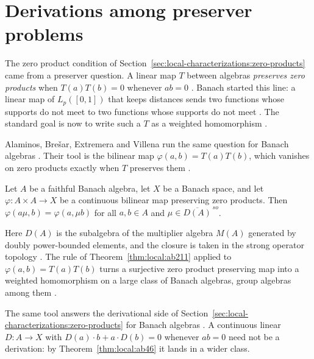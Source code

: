 \section{Derivations among preserver problems}\label{sec:local-characterizations:preservers}

The zero product condition of Section~\ref{sec:local-characterizations:zero-products}
came from a preserver question. A linear map $T$ between algebras
\emph{preserves zero products} when $T(a)T(b)=0$ whenever $ab=0$
\cite[p.~131]{AlaminosBresar2009}. Banach started this line: a linear map of
$L_p([0,1])$ that keeps distances sends two functions whose supports do not
meet to two functions whose supports do not meet
\cite[p.~131]{AlaminosBresar2009}. The standard goal
is now to write such a $T$ as a weighted homomorphism
\cite[p.~132]{AlaminosBresar2009}.

Alaminos, Bre\v{s}ar, Extremera and Villena run the same question for
Banach algebras \cite[p.~131]{AlaminosBresar2009}. Their tool is the
bilinear map $\varphi(a,b)=T(a)T(b)$, which vanishes on zero products
exactly when $T$ preserves them \cite[p.~132]{AlaminosBresar2009}.

\begin{theorem}\label{thm:local:ab211}
Let $A$ be a faithful Banach algebra, let $X$ be a Banach space, and let
$\varphi\colon A\times A\to X$ be a continuous bilinear map preserving zero
products. Then $\varphi(a\mu,b)=\varphi(a,\mu b)$ for all $a,b\in A$ and
$\mu\in\overline{D(A)}^{\,so}$.
\end{theorem}

Here $D(A)$ is the subalgebra of the multiplier algebra $M(A)$ generated by
doubly power-bounded elements, and the closure is taken in the strong
operator topology \cite[p.~143]{AlaminosBresar2009}. The rule of
Theorem~\ref{thm:local:ab211} applied to $\varphi(a,b)=T(a)T(b)$ turns a
surjective zero product preserving map into a weighted homomorphism on a
large class of Banach algebras, group algebras among them
\cite[Theorem~3.6, p.~152]{AlaminosBresar2009}.

The same tool answers the derivational side of
Section~\ref{sec:local-characterizations:zero-products} for Banach algebras
\cite[p.~155]{AlaminosBresar2009}. A continuous linear $D\colon A\to X$
with $D(a)\cdot b+a\cdot D(b)=0$ whenever $ab=0$ need not be a derivation:
by Theorem~\ref{thm:local:ab46} it lands in a wider class.

